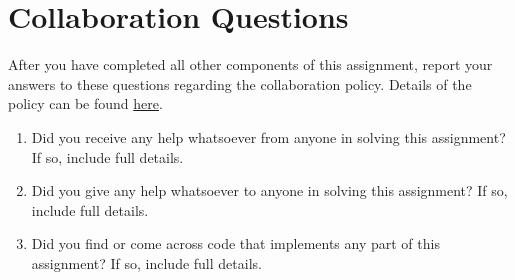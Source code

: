 \documentclass[11pt,addpoints,answers]{exam}
\begin{document}
\begin{questions}
\begin{parts}
\begin{your_solution}[width=5cm, height=2cm]
\end{your_solution}

\end{parts}
\newpage
\section{Collaboration Questions}
After you have completed all other components of this assignment, report your answers to these questions regarding the collaboration policy. Details of the policy can be found \href{https://www.cs.cmu.edu/~mgormley/courses/10601/index.html#syllabus}{here}.
\begin{enumerate}
    \item Did you receive any help whatsoever from anyone in solving this assignment? If so, include full details.
    \item Did you give any help whatsoever to anyone in solving this assignment? If so, include full details.
    \item Did you find or come across code that implements any part of this assignment? If so, include full details.
\end{enumerate}

\begin{your_solution}[height=6cm]

\end{your_solution}
\end{questions}
\end{document}
